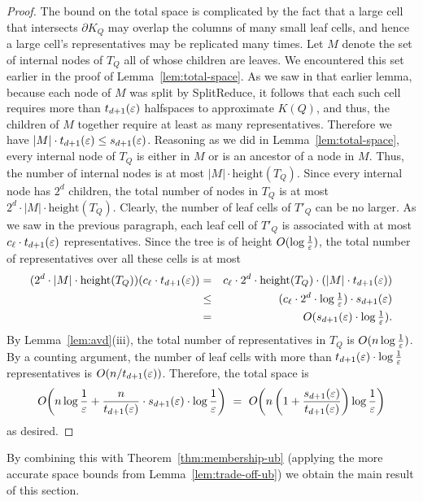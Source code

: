 \documentclass[11pt]{article}   \usepackage[letterpaper,hmargin=2.1cm,vmargin=3cm]{geometry}
\newcommand{\OO}[1]{O\kern-2pt\left(#1\right)}  \newcommand{\half}[1]{\frac{#1}{2}}
\newcommand{\inv}[1]{\frac{1}{#1}}
\newcommand{\alg}{\textrm{SplitReduce}}
\begin{document}
\begin{proof}
The bound on the total space is complicated by the fact that a large cell that intersects $\partial K_Q$ may overlap the columns of many small leaf cells, and hence a large cell's representatives may be replicated many times. Let $M$ denote the set of internal nodes of $T_Q$ all of whose children are leaves. We encountered this set earlier in the proof of Lemma~\ref{lem:total-space}. As we saw in that earlier lemma, because each node of $M$ was split by {\alg}, it follows that each such cell requires more than $t_{d+1}(\varepsilon)$ halfspaces to approximate $K(Q)$, and thus, the children of $M$ together require at least as many representatives. Therefore we have $|M| \cdot t_{d+1}(\varepsilon) \le s_{d+1}(\varepsilon)$. Reasoning as we did in Lemma~\ref{lem:total-space}, every internal node of $T_Q$ is either in $M$ or is an ancestor of a node in $M$. Thus, the number of internal nodes is at most $|M| \cdot \textrm{height}(T_Q)$. Since every internal node has $2^d$ children, the total number of nodes in $T_Q$ is at most $2^d \cdot |M| \cdot \textrm{height}(T_Q)$. Clearly, the number of leaf cells of $T'_Q$ can be no larger. As we saw in the previous paragraph, each leaf cell of $T'_Q$ is associated with at most $c_{\ell} \cdot t_{d+1}(\varepsilon)$ representatives. Since the tree is of height $O(\log \inv{\eps})$, the total number of representatives over all these cells is at most
\begin{eqnarray*}
	(2^d \cdot |M| \cdot \textrm{height}(T_Q)) (c_{\ell} \cdot t_{d+1}(\eps))
		&  =  & c_{\ell} \cdot 2^d \cdot \textrm{height}(T_Q) \cdot (|M| \cdot t_{d+1}(\eps)) \\
		& \le & (c_{\ell} \cdot 2^d \cdot {\textstyle \log \inv{\eps}}) \cdot s_{d+1}(\eps) \\
		&  =  & O(s_{d+1}(\eps) \cdot {\textstyle \log \inv{\eps}}).
\end{eqnarray*}
By Lemma~\ref{lem:avd}(iii), the total number of representatives in $T_Q$ is $O(n \log \inv{\eps})$. By a counting argument, the number of leaf cells with more than $t_{d+1}(\eps) \cdot \log \inv{\eps}$ representatives is $O(n/t_{d+1}(\varepsilon))$. Therefore, the total space is
\[
	\OO{n \log \inv{\eps} + \frac{n}{t_{d+1}(\eps)} \cdot s_{d+1}(\eps) \cdot \log \inv{\eps}}
	~ = ~ \OO{n  \left( 1 + \frac{s_{d+1}(\eps)}{t_{d+1}(\eps)} \right) \log\inv{\eps} }
\]
as desired.
\end{proof}


By combining this with Theorem~\ref{thm:membership-ub} (applying the more accurate space bounds from Lemma~\ref{lem:trade-off-ub}) we obtain the main result of this section.
\end{document}
